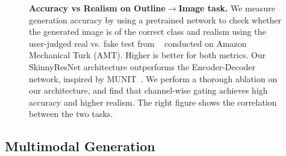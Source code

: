 \begin{figure}[ht]
\begin{minipage}[]{0.48\linewidth}
  \end{minipage}
  \caption{\small {\bf Accuracy vs Realism on Outline$\rightarrow$Image task.} We measure generation accuracy by using a pretrained network to check whether the generated image is of the correct class and realism using the user-judged real vs. fake test from ~\cite{zhang2016colorful,isola2016image2image} conducted on Amazon Mechanical Turk (AMT). Higher is better for both metrics. Our SkinnyResNet architecture outperforms the Encoder-Decoder network, inspired by MUNIT~\cite{huang2018multimodal}. We perform a thorough ablation on our architecture, and find that channel-wise gating achieves high accuracy and higher realism. The right figure shows the correlation between the two tasks.
  \vspace{-4mm}
  }
  \vspace{-3mm}
  \label{fig:acc_vs_real}
\end{figure}


\subsection{Multimodal Generation}
\label{sec:multimodal}


